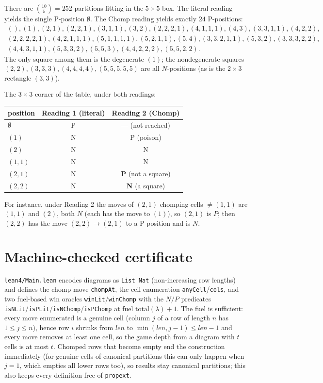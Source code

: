\documentclass[11pt]{article}
\theoremstyle{definition}
\begin{document}
There are $\binom{10}{5}=252$ partitions fitting in the $5\times5$ box. The literal reading
yields the single P-position $\emptyset$. The Chomp reading yields exactly $24$ P-positions:
\[
\begin{gathered}
(), (1), (2,1), (2,2,1), (3,1,1), (3,2), (2,2,2,1), (4,1,1,1), (4,3), (3,3,1,1), (4,2,2),\\
(2,2,2,2,1), (4,2,1,1,1), (5,1,1,1,1), (5,2,1,1), (5,4), (3,3,2,1,1), (5,3,2), (3,3,3,2,2),\\
(4,4,3,1,1), (5,3,3,2), (5,5,3), (4,4,2,2,2), (5,5,2,2).
\end{gathered}
\]
The only square among them is the degenerate $(1)$; the nondegenerate squares
$(2,2),(3,3,3),(4,4,4,4),(5,5,5,5,5)$ are all $N$-positions (as is the $2\times3$ rectangle
$(3,3)$).

The $3\times3$ corner of the table, under both readings:

\begin{center}
\begin{tabular}{lcc}
\toprule
position & Reading 1 (literal) & Reading 2 (Chomp) \\
\midrule
$\emptyset$    & P & --- (not reached) \\
$(1)$          & N & P (poison) \\
$(2)$          & N & N \\
$(1,1)$        & N & N \\
$(2,1)$        & N & \textbf{P} (not a square) \\
$(2,2)$        & N & \textbf{N} (a square) \\
\bottomrule
\end{tabular}
\end{center}

For instance, under Reading 2 the moves of $(2,1)$ chomping cells $\ne(1,1)$ are
$(1,1)$ and $(2)$, both $N$ (each has the move to $(1)$), so $(2,1)$ is $P$; then $(2,2)$ has
the move $(2,2)\to(2,1)$ to a P-position and is $N$.

\section*{Machine-checked certificate}

\texttt{lean4/Main.lean} encodes diagrams as \texttt{List Nat} (non-increasing row lengths)
and defines the chomp move \texttt{chompAt}, the cell enumeration \texttt{anyCell}/\texttt{cols},
and two fuel-based win oracles \texttt{winLit}/\texttt{winChomp} with the $N/P$ predicates
\texttt{isNLit}/\texttt{isPLit}/\texttt{isNChomp}/\texttt{isPChomp} at fuel
$\mathrm{total}(\lambda)+1$. The fuel is sufficient: every move enumerated is a genuine cell
(column $j$ of a row of length $n$ has $1\le j\le n$), hence row $i$ shrinks from $len$ to
$\min(len, j-1)\le len-1$ and every move removes at least one cell, so the game depth from a
diagram with $t$ cells is at most $t$. Chomped rows that become empty end the construction
immediately (for genuine cells of canonical partitions this can only happen when $j=1$, which
empties all lower rows too), so results stay canonical partitions; this also keeps every
definition free of \texttt{propext}.
\end{document}
